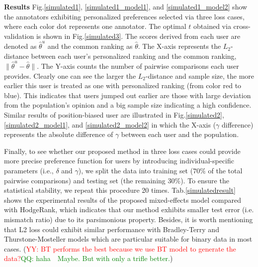 \documentclass[10pt,journal,cspaper,compsoc]{IEEEtran}
\begin{document}
{\textbf{Results} Fig.\ref{simulated1}, \ref{simulated1_model1}, and \ref{simulated1_model2} show the annotators exhibiting personalized preferences selected via three loss cases, where each color dot represents one annotator. The optimal $t$ obtained via cross-validation is shown in Fig.\ref{simulated3}. The scores derived from each user are denoted as $\hat{\theta}^u$ and the common ranking as $\hat{\theta}$. The X-axis represents the $L_2$-distance between each user's personalized ranking and the common ranking, $\|\hat{\theta}^u-\hat{\theta}\|$. The Y-axis counts the number of pairwise comparisons each user provides.
Clearly one can see the larger the $L_2$-distance and sample size, the more earlier this user is treated as one with personalized ranking (from color red to blue). This indicates that users jumped out earlier are those with large deviation from the population's opinion and a big sample size indicating a high confidence. Similar results of position-biased user are illustrated in Fig.\ref{simulated2}, \ref{simulated2_model1}, and \ref{simulated2_model2} in which the X-axis ($\gamma$ difference) represents the absolute difference of $\gamma$ between each user and the population.


Finally, to see whether our proposed method in three loss cases could provide more precise preference function for users by introducing individual-specific parameters (i.e., $\delta$ and $\gamma$), we split the data into training set ($70\%$ of the total pairwise comparisons) and testing set (the remaining $30\%$). To ensure the statistical
stability, we repeat this procedure 20 times. Tab.\ref{simulatedresult} shows the experimental results of the proposed mixed-effects model compared with HodgeRank, which indicates that our method exhibits smaller test error (i.e. mismatch ratio) due to its
parsimonious property. Besides, it is worth mentioning that L2 loss could exhibit similar performance with Bradley-Terry and Thurstone-Mosteller models which are particular suitable for binary data in most cases. (\textcolor{red}{YY: BT performs the best because we use BT model to generate the data?}\textcolor{green}{QQ: haha~~Maybe. But with only a trifle better.})





}
\end{document}
